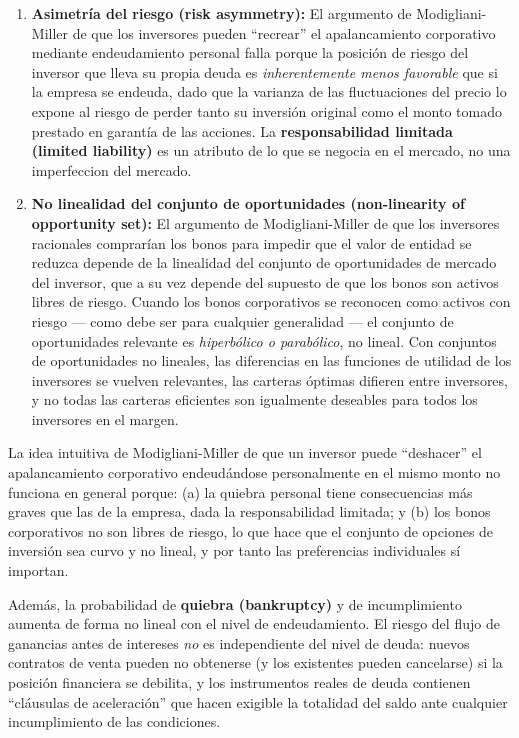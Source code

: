 \documentclass[12pt]{article}
\begin{document}
\begin{enumerate}
  \item \textbf{Asimetr\'ia del riesgo (risk asymmetry):} El argumento de Modigliani-Miller de que los inversores pueden ``recrear'' el apalancamiento corporativo mediante endeudamiento personal falla porque la posici\'on de riesgo del inversor que lleva su propia deuda es \textit{inherentemente menos favorable} que si la empresa se endeuda, dado que la varianza de las fluctuaciones del precio lo expone al riesgo de perder tanto su inversi\'on original como el monto tomado prestado en garant\'ia de las acciones. La \textbf{responsabilidad limitada (limited liability)} es un atributo de lo que se negocia en el mercado, no una imperfeccion del mercado.

  \item \textbf{No linealidad del conjunto de oportunidades (non-linearity of opportunity set):} El argumento de Modigliani-Miller de que los inversores racionales comprar\'ian los bonos para impedir que el valor de entidad se reduzca depende de la linealidad del conjunto de oportunidades de mercado del inversor, que a su vez depende del supuesto de que los bonos son activos libres de riesgo. Cuando los bonos corporativos se reconocen como activos con riesgo --- como debe ser para cualquier generalidad --- el conjunto de oportunidades relevante es \textit{hiperb\'olico o parab\'olico}, no lineal. Con conjuntos de oportunidades no lineales, las diferencias en las funciones de utilidad de los inversores se vuelven relevantes, las carteras \'optimas difieren entre inversores, y no todas las carteras eficientes son igualmente deseables para todos los inversores en el margen.
\end{enumerate}

\begin{intuicion}
La idea intuitiva de Modigliani-Miller de que un inversor puede ``deshacer'' el apalancamiento corporativo endeud\'andose personalmente en el mismo monto no funciona en general porque: (a) la quiebra personal tiene consecuencias m\'as graves que las de la empresa, dada la responsabilidad limitada; y (b) los bonos corporativos no son libres de riesgo, lo que hace que el conjunto de opciones de inversi\'on sea curvo y no lineal, y por tanto las preferencias individuales s\'i importan.
\end{intuicion}

Adem\'as, la probabilidad de \textbf{quiebra (bankruptcy)} y de incumplimiento aumenta de forma no lineal con el nivel de endeudamiento. El riesgo del flujo de ganancias antes de intereses \textit{no} es independiente del nivel de deuda: nuevos contratos de venta pueden no obtenerse (y los existentes pueden cancelarse) si la posici\'on financiera se debilita, y los instrumentos reales de deuda contienen ``cl\'ausulas de aceleraci\'on'' que hacen exigible la totalidad del saldo ante cualquier incumplimiento de las condiciones.
\end{document}
